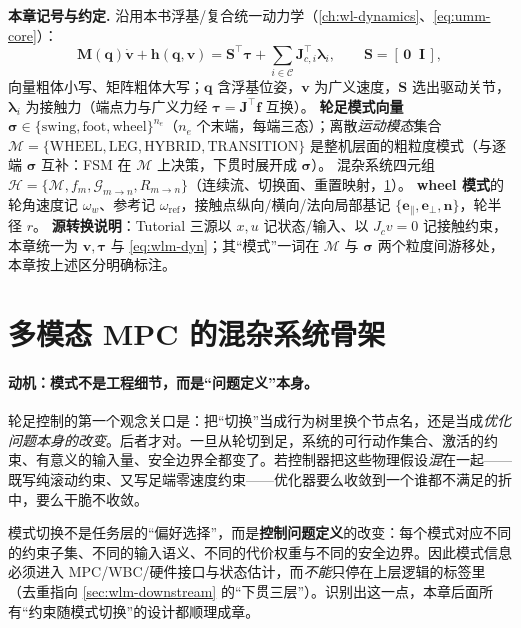 \begin{note}
\textbf{本章记号与约定.}\;
沿用本书浮基/复合统一动力学（\cref{ch:wl-dynamics}、\cref{eq:umm-core}）：
\begin{equation}
  \mathbf M(\mathbf q)\dot{\mathbf v}+\mathbf h(\mathbf q,\mathbf v)=\mathbf S^\top\boldsymbol\tau+\sum_{i\in\mathcal C}\mathbf J_{c,i}^\top\boldsymbol\lambda_i,
  \qquad \mathbf S=[\,\mathbf 0\;\;\mathbf I\,],
  \label{eq:wlm-dyn}
\end{equation}
向量粗体小写、矩阵粗体大写；$\mathbf q$ 含浮基位姿，$\mathbf v$ 为广义速度，$\mathbf S$ 选出驱动关节，$\boldsymbol\lambda_i$ 为接触力（端点力与广义力经 $\boldsymbol\tau=\mathbf J^\top\mathbf f$ 互换）。
\textbf{轮足模式向量} $\boldsymbol\sigma\in\{\mathrm{swing},\mathrm{foot},\mathrm{wheel}\}^{n_e}$（$n_e$ 个末端，每端三态）；离散\emph{运动模态}集合 $\mathcal M=\{\mathrm{WHEEL},\mathrm{LEG},\mathrm{HYBRID},\mathrm{TRANSITION}\}$ 是整机层面的粗粒度模式（与逐端 $\boldsymbol\sigma$ 互补：FSM 在 $\mathcal M$ 上决策，下贯时展开成 $\boldsymbol\sigma$）。
混杂系统四元组 $\mathcal H=\{\mathcal M,f_m,\mathcal G_{m\to n},R_{m\to n}\}$（连续流、切换面、重置映射，\cref{sec:wlm-hybrid}）。
\textbf{wheel 模式}的轮角速度记 $\omega_w$、参考记 $\omega_{\mathrm{ref}}$，接触点纵向/横向/法向局部基记 $\{\mathbf e_\parallel,\mathbf e_\perp,\mathbf n\}$，轮半径 $r$。
\textbf{源转换说明}：Tutorial 三源以 $x,u$ 记状态/输入、以 $J_c v=0$ 记接触约束，本章统一为 $\mathbf v,\boldsymbol\tau$ 与 \cref{eq:wlm-dyn}；其“模式”一词在 $\mathcal M$ 与 $\boldsymbol\sigma$ 两个粒度间游移处，本章按上述区分明确标注。
\end{note}

\section{多模态 MPC 的混杂系统骨架}
\label{sec:wlm-hybrid}

\paragraph{动机：模式不是工程细节，而是“问题定义”本身。}
轮足控制的第一个观念关口是：把“切换”当成行为树里换个节点名，还是当成\emph{优化问题本身的改变}。后者才对。一旦从轮切到足，系统的可行动作集合、激活的约束、有意义的输入量、安全边界全都变了。若控制器把这些物理假设\emph{混}在一起——既写纯滚动约束、又写足端零速度约束——优化器要么收敛到一个谁都不满足的折中，要么干脆不收敛。

\begin{insight}\label{ins:wlm-problem-change}
模式切换不是任务层的“偏好选择”，而是\textbf{控制问题定义}的改变：每个模式对应不同的约束子集、不同的输入语义、不同的代价权重与不同的安全边界。因此模式信息必须进入 MPC/WBC/硬件接口与状态估计，而\emph{不能}只停在上层逻辑的标签里（去重指向 \cref{sec:wlm-downstream} 的“下贯三层”）。识别出这一点，本章后面所有“约束随模式切换”的设计都顺理成章。
\end{insight}

